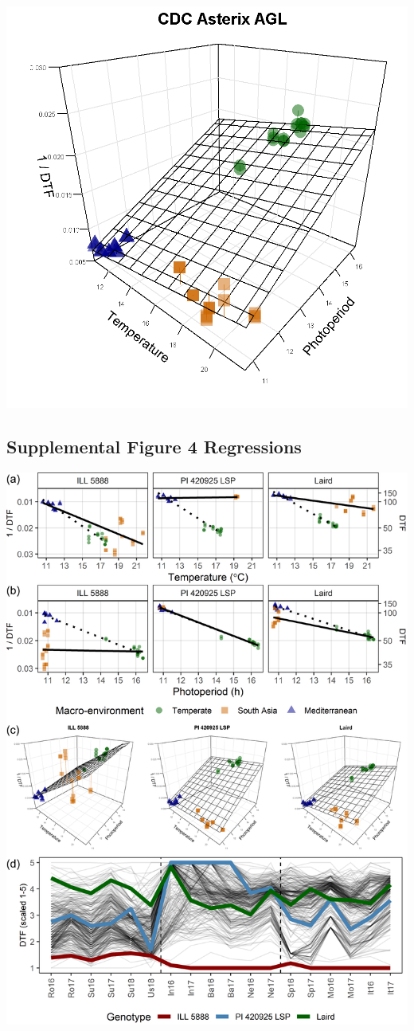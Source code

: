 \documentclass[
]{article}
\begin{document}
\includegraphics{Additional/Entry_3D/3d_Entry_001.png}

\hypertarget{supplemental-figure-4-regressions}{%
\subsection{Supplemental Figure 4
Regressions}\label{supplemental-figure-4-regressions}}

\includegraphics{Supplemental_Figure_04.png}
\end{document}
